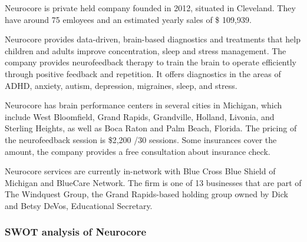 \documentclass[letterpaper,10pt]{article}
\begin{document}

Neurocore is private held company founded in 2012, situated in Cleveland. They have around 75 emloyees and an estimated yearly sales of \$ 109,939. \cite{mergent_intellect}



Neurocore provides data-driven, brain-based diagnostics and treatments that help children and adults improve concentration, sleep and stress management. The company provides neurofeedback therapy to train the brain to operate efficiently through positive feedback and repetition. It offers diagnostics in the areas of ADHD, anxiety, autism, depression, migraines, sleep, and stress. \cite{bloomberg}

Neurocore has brain performance centers in several cities in Michigan, which include West Bloomfield, Grand Rapids, Grandville,  Holland, Livonia, and Sterling Heights, as well as Boca Raton and Palm Beach, Florida. The pricing of the neurofeedback session is \$2,200 /30 sessions. Some insurances cover the amount, the company provides a free consultation about insurance check. 
\cite{neurocore}

Neurocore services are currently in-network with Blue Cross Blue Shield of Michigan and BlueCare Network. The firm is one of 13 businesses that are part of The Windquest Group, the Grand Rapids-based holding group owned by Dick and Betsy DeVos, Educational Secretary.

\cite{neurocore_loc}

\subsubsection{SWOT analysis of Neurocore}
\end{document}
